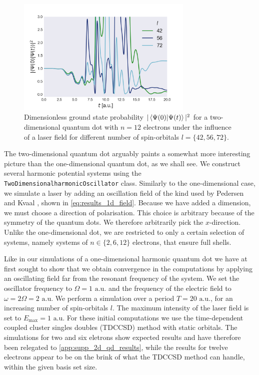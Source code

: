 \begin{figure}
    \centering
    \includegraphics[width=0.75\textwidth]{results/figures/2D/n12_overlap.png} 
    \caption{Dimensionless ground state probability $|\braket{\Psi(0)}{\Psi(t)}|^2$ for a two-dimensional
        quantum dot with $n=12$ electrons under the influence of a laser field for 
        different number of spin-orbitals $l=\{42,56,72\}$. 
    }
    \label{fig:n12_2d_overlap}
\end{figure}

The two-dimensional quantum dot arguably paints a somewhat more interesting picture 
than the one-dimensional quantum dot, as we shall see. We construct several 
harmonic potential systems using the  \lstinline{TwoDimensionalharmonicOscillator} class.
Similarly to the one-dimensional case, we simulate a laser by adding an 
oscillation field of the kind used by
Pedersen and Kvaal \cite{pedersen2019symplectic}, shown 
in \autoref{eq:results_1d_field}. Because we have added a dimension, we must 
choose a direction of polarisation. This choice is arbitrary because of the 
symmetry of the quantum dots. We therefore arbitrarily pick the $x$-direction.
Unlike the one-dimensional dot, we are restricted to only a certain selection of 
systems, namely systems of $n\in\{2,6,12\}$ electrons, that ensure full shells.

Like in our simulations of a one-dimensional harmonic quantum dot we have at first 
sought to show that we obtain convergence in the computations by applying an oscillating 
field far from the resonant frequency of the system. We set the oscillator frequency 
to $\Omega=1 \text{ a.u.}$ and the frequency of the electric field to $\omega=2\Omega=2 \text{ a.u.}$
We 
perform a simulation over a period $T = 20 \text{ a.u.}$, for an increasing 
number of spin-orbitals $l$. The maximum intensity of the laser field is set to 
$E_\text{max} = 1 \text{ a.u.}$ For these initial computations we use the 
time-dependent coupled cluster singles doubles (TDCCSD) method with static 
orbitals. The simulations for two and six eletrons show expected results and have
therefore been relegated to \autoref{app:supp_2d_qd_results}, while the results for
twelve electrons appear to be on the brink of what the TDCCSD method 
can handle, within the given basis set size.

